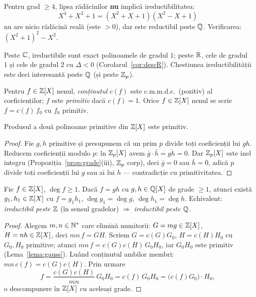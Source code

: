 \begin{observatie}
Pentru grad $\ge4$, lipsa rădăcinilor \textbf{nu} implică ireductibilitatea:
\[
X^4+X^2+1=(X^2+X+1)(X^2-X+1)
\]
nu are nicio rădăcină reală (este $>0$), dar este reductibil peste $\mathbb{Q}$. Verificarea: $(X^2+1)^2-X^2$.
\end{observatie}

\begin{corolar}
Peste $\mathbb{C}$, ireductibile sunt exact polinoamele de gradul $1$; peste $\mathbb{R}$, cele de gradul $1$ și cele de gradul $2$ cu $\Delta<0$ (Corolarul~\ref{cor:descR}). Chestiunea ireductibilității este deci interesantă peste $\mathbb{Q}$ (și peste $\mathbb{Z}_p$).
\end{corolar}

\begin{definitie}
Pentru $f\in\mathbb{Z}[X]$ nenul, \emph{conținutul} $c(f)$ este c.m.m.d.c.\ (pozitiv) al coeficienților; $f$ este \emph{primitiv} dacă $c(f)=1$. Orice $f\in\mathbb{Z}[X]$ nenul se scrie $f=c(f)\,f_0$ cu $f_0$ primitiv.
\end{definitie}

\begin{lema}[Gauss]\label{lema:gauss}
Produsul a două polinoame primitive din $\mathbb{Z}[X]$ este primitiv.
\end{lema}

\begin{proof}
Fie $g,h$ primitive și presupunem că un prim $p$ divide toți coeficienții lui $gh$. Reducem coeficienții modulo $p$: în $\mathbb{Z}_p[X]$ avem $\bar g\cdot\bar h=\overline{gh}=0$. Dar $\mathbb{Z}_p[X]$ este inel integru (Propoziția~\ref{prop:grade}(iii), $\mathbb{Z}_p$ corp), deci $\bar g=0$ sau $\bar h=0$, adică $p$ divide toți coeficienții lui $g$ sau ai lui $h$ --- contradicție cu primitivitatea.
\end{proof}

\begin{teorema}\label{teo:gauss}
Fie $f\in\mathbb{Z}[X]$, $\deg f\ge1$. Dacă $f=gh$ cu $g,h\in\mathbb{Q}[X]$ de grade $\ge1$, atunci există $g_1,h_1\in\mathbb{Z}[X]$ cu $f=g_1h_1$, $\deg g_1=\deg g$, $\deg h_1=\deg h$. Echivalent: \emph{ireductibil peste $\mathbb{Z}$} (în sensul gradelor) $\Rightarrow$ \emph{ireductibil peste $\mathbb{Q}$}.
\end{teorema}

\begin{proof}
Alegem $m,n\in\mathbb{N}^*$ care elimină numitorii: $G=mg\in\mathbb{Z}[X]$, $H=nh\in\mathbb{Z}[X]$, deci $mn\,f=GH$. Scriem $G=c(G)G_0$, $H=c(H)H_0$ cu $G_0,H_0$ primitive; atunci $mn\,f=c(G)c(H)\,G_0H_0$, iar $G_0H_0$ este primitiv (Lema~\ref{lema:gauss}). Luând conținutul ambilor membri: $mn\,c(f)=c(G)c(H)$. Prin urmare
\[
f=\frac{c(G)c(H)}{mn}\,G_0H_0=c(f)\,G_0H_0=\bigl(c(f)G_0\bigr)\cdot H_0,
\]
o descompunere în $\mathbb{Z}[X]$ cu aceleași grade.
\end{proof}

